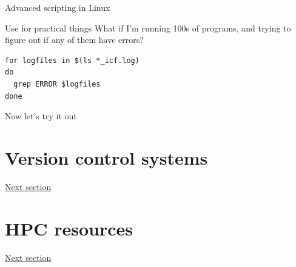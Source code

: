 \documentclass[xcolor=table,compress]{beamer}
\begin{document}
\begin{frame}[fragile]{Advanced scripting in Linux}
\begin{block}{Use for practical things}
What if I'm running 100s of programs, and trying to figure out
if any of them have errors?
\begin{lstlisting}
for logfiles in $(ls *_icf.log)
do
  grep ERROR $logfiles
done
\end{lstlisting}
\end{block}
\end{frame}





\begin{frame}
Now let's try it out
\end{frame}

\section[VCS]{Version control systems}
\begin{frame}
\href{day1-2.pdf}{Next section}
\end{frame}

\section{HPC resources}
\begin{frame}
\href{day1-3.pdf}{Next section}
\end{frame}
\end{document}
